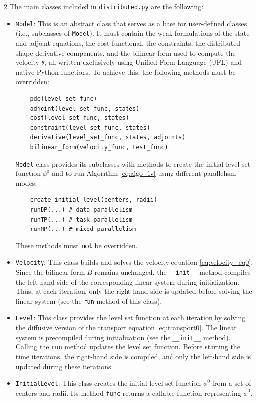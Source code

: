 \documentclass[a4paper, oneside]{article}
\newcommand{\code}[1]{\texttt{#1}}
\begin{document}
\begin{multicols}{2}
The main classes included in \code{distributed.py} are the following:
\begin{itemize}[left=0.0em]
\item \code{Model}:
This is an abstract class that serves as a base for user-defined classes
(i.e., subclasses of \code{Model}).
It must contain
the weak formulations of the state and adjoint equations,
the cost functional, the constraints,
the distributed shape derivative components, and
the bilinear form used to compute the velocity $\theta$, all written exclusively using Unified Form Language (UFL) and native Python functions.
To achieve this, the following methods must be overridden:
\begin{lstlisting}
	pde(level_set_func)
	adjoint(level_set_func, states)
	cost(level_set_func, states)
	constraint(level_set_func, states)
	derivative(level_set_func, states, adjoints)
	bilinear_form(velocity_func, test_func)
\end{lstlisting}
\code{Model} class provides its subclasses with
methods to create the initial level set function $\phi^0$
and to run Algorithm \ref{eq:algo_lv} using
different parallelism modes:
\begin{lstlisting}
	create_initial_level(centers, radii)
	runDP(...) # data parallelism
	runTP(...) # task parallelism
	runMP(...) # mixed parallelism
\end{lstlisting}
These methods must \textbf{not} be overridden.

\item \code{Velocity}:
This class builds and solves the velocity equation \eqref{eq:velocity_eq0}. 
Since the bilinear form $B$ remains unchanged, the \code{\_\_init\_\_} method
compiles the left-hand side of the corresponding linear system during initialization.
Thus, at each iteration, only the right-hand side is updated before solving
the linear system (see the \code{run} method of this class). 

\item \code{Level}:
This class provides the level set function at each iteration
by solving the diffusive version of the transport equation \eqref{eq:transport0}. 
The linear system is precompiled during initialization
(see the \code{\_\_init\_\_} method). 
Calling the \code{run} method updates the level set function.
Before starting the time iterations, the right-hand side is compiled,
and only the left-hand side is updated during these iterations.

\item \code{InitialLevel}:
This class creates the initial level set function $\phi^0$
from a set of centers and radii.
Its method \code{func} returns a callable function representing $\phi^0$.


\end{itemize}
\end{multicols}
\end{document}
